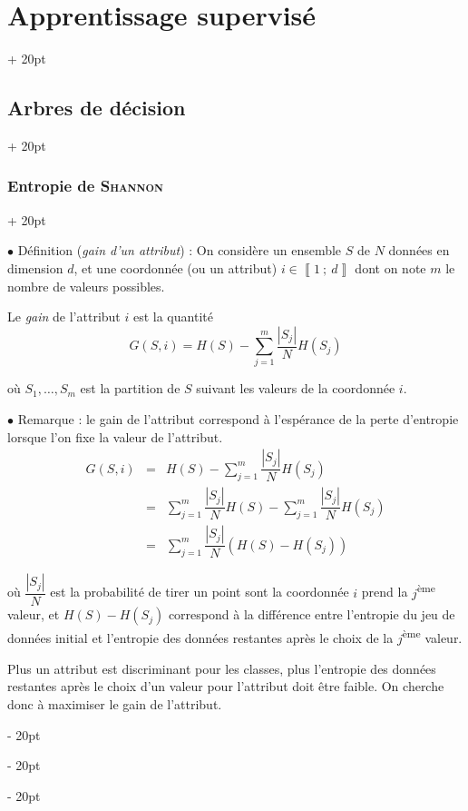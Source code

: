 \documentclass[a4paper, 12pt, twoside]{article}
\newcommand{\nset}[2]{\left\llbracket #1\ ;\ #2 \right\rrbracket}
\newcommand{\abs}[1]{\left\lvert #1 \right\rvert}
\newcommand{\ind}[1][20pt]{\advance\leftskip + #1}
\newcommand{\deind}[1][20pt]{\advance\leftskip - #1}
\newenvironment{indt}[2][20pt]{#2 \par \ind[#1]}{\par \deind} %
\begin{document}
\begin{indt}{\section{Apprentissage supervisé}}
\begin{indt}{\subsection{Arbres de décision}}
\begin{indt}{\subsubsection{Entropie de \textsc{Shannon}}}
                \vspace{12pt}
                
                $\bullet$ Définition (\textit{gain d'un attribut}) :
                On considère un ensemble $S$ de $N$ données en dimension $d$, et une coordonnée (ou un attribut) $i \in \nset 1 d$ dont on note $m$ le nombre de valeurs possibles.

                Le \emph{gain} de l'attribut $i$ est la quantité
                \[
                    G(S, i) = H(S) - \sum_{j = 1}^m \dfrac{\abs{S_j}}{N} H(S_j)
                \]

                où $S_1, \ldots, S_m$ est la partition de $S$ suivant les valeurs de la coordonnée $i$.

                \vspace{12pt}
                
                $\bullet$ Remarque : le gain de l'attribut correspond à l'espérance de la perte d'entropie lorsque l'on fixe la valeur de l'attribut.
                \[
                    \begin{array}{rcl}
                        G(S, i)
                        &=& \displaystyle
                        H(S) - \sum_{j = 1}^m \dfrac{\abs{S_j}}{N} H(S_j)
                        \\
                        &=& \displaystyle
                        \sum_{j = 1}^m \dfrac{\abs{S_j}}{N} H(S)
                        - \sum_{j = 1}^m \dfrac{\abs{S_j}}{N} H(S_j)
                        \\
                        &=& \displaystyle
                        \sum_{j = 1}^m \dfrac{\abs{S_j}}{N} (H(S) - H(S_j))
                    \end{array}
                \]

                où $\dfrac{\abs{S_j}} N$ est la probabilité de tirer un point sont la coordonnée $i$ prend la $j$\textsuperscript{ème} valeur, et $H(S) - H(S_j)$ correspond à la différence entre l'entropie du jeu de données initial et l'entropie des données restantes après le choix de la $j$\textsuperscript{ème} valeur.

                \vspace{6pt}
                
                Plus un attribut est discriminant pour les classes, plus l'entropie des données restantes après le choix d'un valeur pour l'attribut doit être faible. On cherche donc à maximiser le gain de l'attribut.


\end{indt}
\end{indt}
\end{indt}
\end{document}
